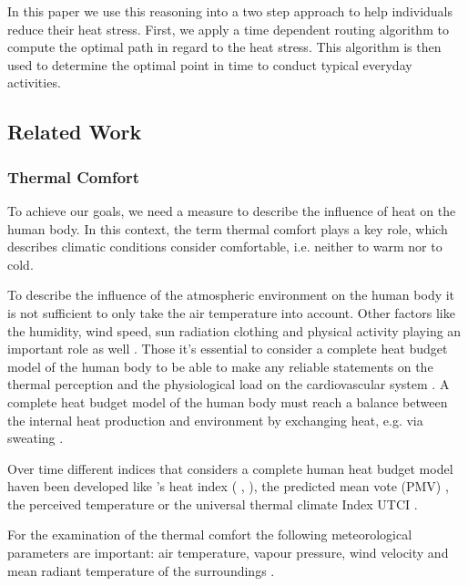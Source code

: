 In this paper we use this reasoning into a two step approach to help individuals reduce their heat stress. First, we apply a time dependent routing algorithm to compute the optimal path in regard to the heat stress. This algorithm is then used to determine the optimal point in time to conduct typical everyday activities. 



   
\subsection{Related Work} 

\subsubsection{Thermal Comfort}

To achieve our goals, we need a measure to describe the influence of heat on the human body.  In this context, the term thermal comfort plays a key role, which describes climatic conditions consider comfortable, i.e. neither to warm nor to cold.

To describe the influence of the atmospheric environment on the human body it is not sufficient to only take the air temperature into account. Other factors like the humidity, wind speed, sun radiation clothing and physical activity playing an important role as well \parencite{Staiger2011,Huebler2007}.  Those it's essential to consider a complete heat budget model of the human body to be able to make any reliable statements on the thermal perception and the physiological load on the cardiovascular system \parencite{Staiger1997}. A complete heat budget model of the human body must reach a balance between the internal heat production and environment by exchanging heat, e.g. via sweating \parencite{Staiger2011}. 

Over time different indices that considers a complete human heat budget model haven been developed like \citeauthor{Steadman1979}'s heat index  (\citeauthor{Steadman1979} \citeyear*{Steadman1979}, \citeyear*{Steadman1979a}), the predicted mean vote (PMV) \parencite{Fanger1973}, the perceived temperature \parencite{Staiger1997,Jendritzky2000} or the universal thermal climate Index UTCI \parencite{Jendritzky2010}.

For the examination of the thermal comfort the following meteorological parameters are important: air temperature, vapour pressure,
wind velocity and mean radiant temperature of the surroundings \parencite{Matzarakis1999}.

